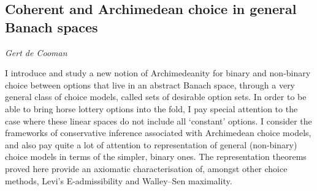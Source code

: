\documentclass[../booklet.tex]{subfiles}
\begin{document}
\subsection[Coherent and Archimedean choice in general Banach spaces. {\it Gert de Cooman}]{Coherent and Archimedean choice in general Banach spaces}

\begin{center}
  {\it Gert de Cooman}
\end{center}



I introduce and study a new notion of Archimedeanity for binary and non-binary choice between options that live in an abstract Banach space, through a very general class of choice models, called sets of desirable option sets.
In order to be able to bring horse lottery options into the fold, I pay special attention to the case where these linear spaces do not include all `constant' options.
I consider the frameworks of conservative inference associated with Archimedean choice models, and also pay quite a lot of attention to representation of general (non-binary) choice models in terms of the simpler, binary ones.
The representation theorems proved here provide an axiomatic characterisation of, amongst other choice methods, Levi's E-admissibility and Walley--Sen maximality.

\end{document}
